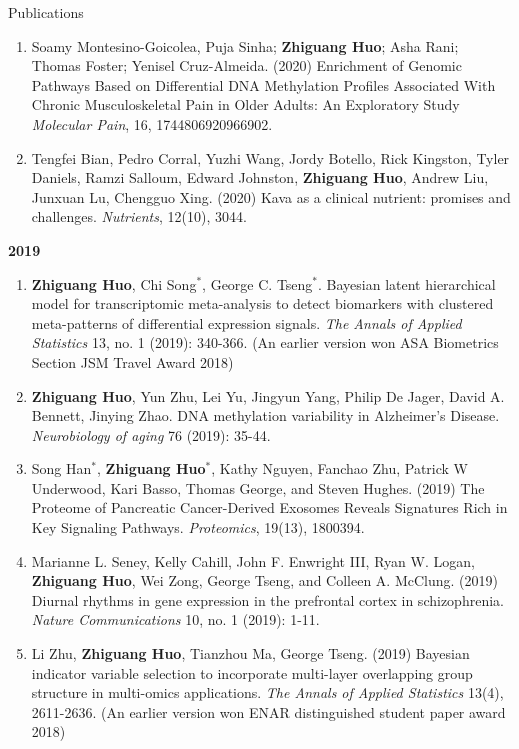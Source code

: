 \documentclass{resume} %
\begin{document}
\begin{rSection}{Publications}
\begin{enumerate}[noitemsep,topsep=0pt, resume]
\item
Soamy Montesino-Goicolea, Puja Sinha; {\bf Zhiguang Huo}; Asha Rani; Thomas Foster; Yenisel Cruz-Almeida. (2020)
Enrichment of Genomic Pathways Based on Differential DNA Methylation Profiles Associated With Chronic Musculoskeletal Pain in Older Adults: An Exploratory Study
\emph{Molecular Pain}, 16, 1744806920966902.

\item  
Tengfei Bian, Pedro Corral, Yuzhi Wang, Jordy Botello, Rick Kingston, Tyler Daniels, Ramzi Salloum, Edward Johnston, {\bf Zhiguang Huo}, Andrew Liu,  Junxuan Lu, Chengguo Xing. (2020)
Kava as a clinical nutrient: promises and challenges.
\emph{Nutrients}, 12(10), 3044.




\end{enumerate}


\textbf{2019}
\begin{enumerate}[noitemsep,topsep=0pt,resume]




\item 
{\bf Zhiguang Huo}, Chi Song$^*$, George C. Tseng$^*$. 
Bayesian latent hierarchical model for transcriptomic meta-analysis to detect biomarkers with clustered meta-patterns of differential expression signals. \emph{The Annals of Applied Statistics} 13, no. 1 (2019): 340-366. (An earlier version won ASA Biometrics Section JSM Travel Award 2018)


\item 
{\bf Zhiguang Huo}, Yun Zhu, Lei Yu, Jingyun Yang, Philip De Jager, David A. Bennett, Jinying Zhao.
 DNA methylation variability in Alzheimer's Disease. \emph{Neurobiology of aging} 76 (2019): 35-44.

\item Song Han$^*$, {\bf Zhiguang Huo}$^*$,  Kathy Nguyen,  Fanchao Zhu, Patrick W Underwood, Kari Basso, Thomas George, and Steven Hughes. (2019)
The Proteome of Pancreatic Cancer-Derived Exosomes Reveals Signatures Rich in Key Signaling Pathways. \emph{Proteomics}, 19(13), 1800394.


\item Marianne L. Seney, Kelly Cahill, John F. Enwright III, Ryan W. Logan, {\bf  Zhiguang Huo}, Wei Zong, George Tseng, and Colleen A. McClung. (2019) Diurnal rhythms in gene expression in the prefrontal cortex in schizophrenia. \emph{Nature Communications} 10, no. 1 (2019): 1-11.


\item Li Zhu, {\bf  Zhiguang Huo}, Tianzhou Ma, George Tseng. (2019)
Bayesian indicator variable selection to incorporate multi-layer overlapping group structure in multi-omics applications. 
\emph{The Annals of Applied Statistics} 13(4), 2611-2636. 
(An earlier version won ENAR distinguished student paper award 2018)



\end{enumerate}
\end{rSection}
\end{document}
